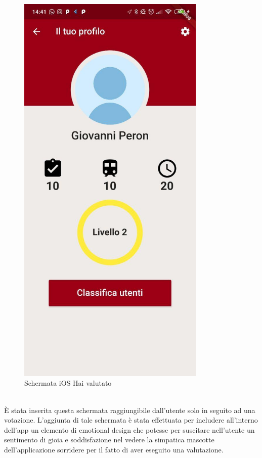 \hfill
\begin{minipage}{0.45\textwidth}
	\begin{figure}[H]
		\centering
		\includegraphics[width=0.8\textwidth]{immagini/profile.jpg}
		\caption{Schermata iOS Hai valutato}
	\end{figure}
\end{minipage}
\vspace{1cm}
\\
È stata inserita questa schermata raggiungibile dall'utente solo in seguito ad una votazione. L'aggiunta di tale schermata è stata effettuata per includere all'interno dell'app un elemento di emotional design che potesse per suscitare nell'utente un sentimento di gioia e soddisfazione nel vedere la simpatica mascotte dell'applicazione sorridere per il fatto di aver eseguito una valutazione.
